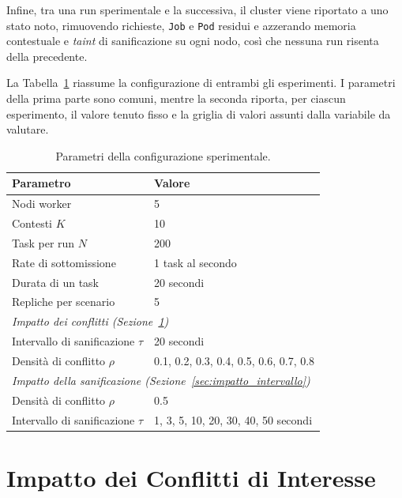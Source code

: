 Infine, tra una run sperimentale e la successiva, il cluster viene riportato a uno stato noto, rimuovendo richieste, \texttt{Job} e \texttt{Pod} residui e azzerando memoria contestuale e \emph{taint} di sanificazione su ogni nodo, così che nessuna run risenta della precedente.

La Tabella~\ref{tab:parametri_valutazione} riassume la configurazione di entrambi gli esperimenti. I parametri della prima parte sono comuni, mentre la seconda riporta, per ciascun esperimento, il valore tenuto fisso e la griglia di valori assunti dalla variabile da valutare.

\begin{table}[ht]
    \centering
    \begin{tabular}{ll}
        \toprule
        \textbf{Parametro} & \textbf{Valore} \\
        \midrule
        Nodi worker & 5 \\
        Contesti $K$ & 10 \\
        Task per run $N$ & 200 \\
        Rate di sottomissione & 1 task al secondo \\
        Durata di un task & 20 secondi \\
        Repliche per scenario & 5 \\
        \midrule
        \multicolumn{2}{l}{\textit{Impatto dei conflitti (Sezione~\ref{sec:impatto_conflitti})}} \\
        Intervallo di sanificazione $\tau$ & 20 secondi \\
        Densità di conflitto $\rho$ & 0.1, 0.2, 0.3, 0.4, 0.5, 0.6, 0.7, 0.8 \\
        \midrule
        \multicolumn{2}{l}{\textit{Impatto della sanificazione (Sezione~\ref{sec:impatto_intervallo})}} \\
        Densità di conflitto $\rho$ & 0.5\\
        Intervallo di sanificazione $\tau$ & 1, 3, 5, 10, 20, 30, 40, 50 secondi\\
        \bottomrule
    \end{tabular}
    \caption{Parametri della configurazione sperimentale.}
    \label{tab:parametri_valutazione}
\end{table}


\section{Impatto dei Conflitti di Interesse}
\label{sec:impatto_conflitti}

